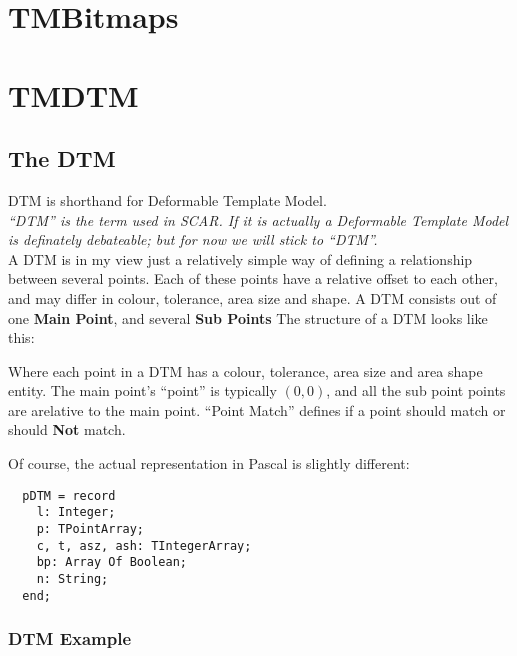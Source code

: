 \documentclass[a4paper, 10pt]{report} %
\begin{document}


\section{TMBitmaps}

\section{TMDTM}

\subsection{The DTM}

DTM is shorthand for Deformable Template Model. \\

\emph{``DTM'' is the term used in SCAR. If it is actually a Deformable Template
Model is definately debateable; but for now we will stick to ``DTM''.} \\

A DTM is in my view just a relatively simple way of defining a relationship
between several points. Each of these points have a relative offset to each
other, and may differ in colour, tolerance, area size and shape.
A DTM consists out of one \textbf{Main Point}, and several \textbf{Sub Points}
The structure of a DTM looks like this:


Where each point in a DTM has a colour, tolerance, area size and area shape
entity. The main point's ``point'' is typically $ (0, 0) $, and all the
sub point points are arelative to the main point. ``Point Match'' defines if a point should match or should \textbf{Not} match.

Of course, the actual representation in Pascal is slightly different:


\begin{verbatim}
  pDTM = record
    l: Integer;
    p: TPointArray;
    c, t, asz, ash: TIntegerArray;
    bp: Array Of Boolean;
    n: String;
  end;
\end{verbatim}

\subsubsection{DTM Example}
\end{document}
